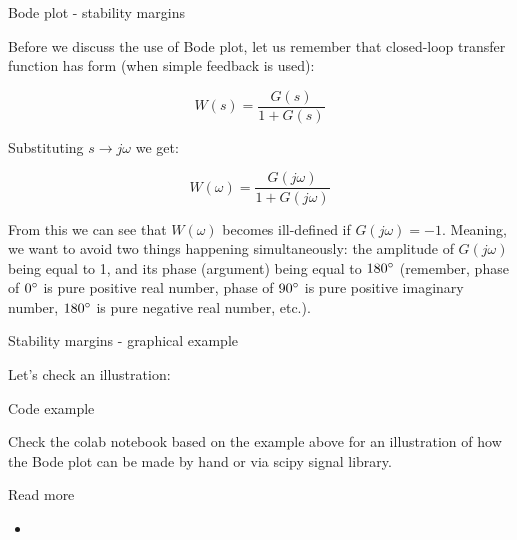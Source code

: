 \documentclass{beamer}
\begin{document}
\begin{frame}{Bode plot - stability margins}
\begin{flushleft}

Before we discuss the use of Bode plot, let us remember that closed-loop transfer function has form (when simple feedback is used):

\begin{equation}
    W(s) = \frac{G(s)}{1 + G(s)}
\end{equation}

Substituting $s \longrightarrow j \omega$ we get:

\begin{equation}
    W(\omega) = \frac{G(j \omega)}{1 + G(j \omega)}
\end{equation}

From this we can see that $W(\omega)$ becomes ill-defined if $G(j \omega) = -1$. Meaning, we want to avoid two things happening simultaneously: the amplitude of $G(j \omega)$ being equal to 1, and its phase (argument) being equal to $180^{\circ}$ (remember, phase of $0^{\circ}$ is pure positive real number, phase of $90^{\circ}$ is pure positive imaginary number, $180^{\circ}$ is pure negative real number, etc.).

\end{flushleft}
\end{frame}





\begin{frame}{Stability margins - graphical example}
\begin{flushleft}

Let's check an illustration:

\bigskip

\centerline{\textcolor{black}{}}


\end{flushleft}
\end{frame}




\begin{frame}{Code example}
\begin{flushleft}

Check the colab notebook based on the example above for an illustration of how the Bode plot can be made by hand or via scipy signal library.

\bigskip

\centerline{\textcolor{black}{}}


\end{flushleft}
\end{frame}




\begin{frame}{Read more}

\begin{itemize}
\item {}


\end{itemize}

\end{frame}




\myqrframe
\end{document}
